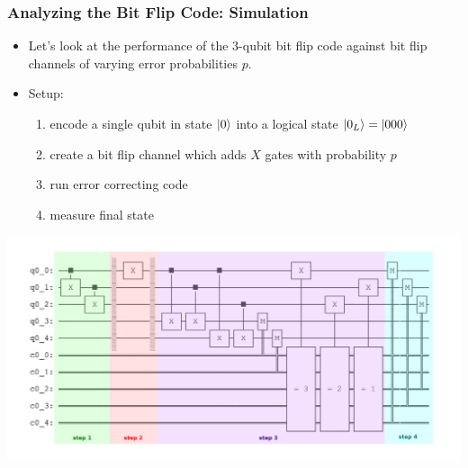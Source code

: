 \documentclass{beamer}
\begin{document}
\begin{frame}
    \frametitle{Analyzing the Bit Flip Code: Simulation}
    \begin{itemize}
        \item Let's look at the performance of the 3-qubit bit flip code against bit flip channels of varying error probabilities $p$.
        \item Setup: 
        \begin{enumerate}
            \item encode a single qubit in state $\left\vert{0}\right\rangle$ into a logical state $\left\vert{0_L}\right\rangle = \left\vert{000}\right\rangle$
            \item create a bit flip channel which adds $X$ gates with probability $p$
            \item run error correcting code
            \item measure final state 
        \end{enumerate}
    \end{itemize}
    \centering \pause
    \includegraphics[scale=0.12]{3qb-circuit-2-color.png} 
\end{frame}
\end{document}
